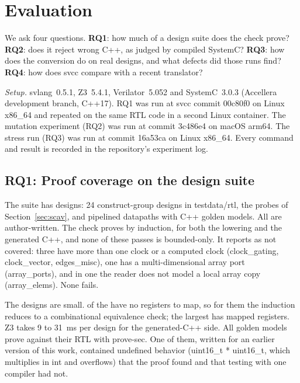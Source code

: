 \documentclass[conference]{IEEEtran}
\newcommand{\code}[1]{{\fontshape{n}\ttfamily #1}}
\begin{document}
\section{Evaluation}
\label{sec:eval}

We ask four questions. \textbf{RQ1}: how much of a design suite does the check prove?
\textbf{RQ2}: does it reject wrong C++, as judged by compiled SystemC? \textbf{RQ3}: how does the
conversion do on real designs, and what defects did those runs find? \textbf{RQ4}: how does
\code{svcc} compare with a recent translator?

\emph{Setup.} \code{svlang}~0.5.1, Z3~5.4.1, Verilator~5.052 and SystemC~3.0.3 (Accellera
\code{development} branch, C++17). RQ1 was run at \code{svcc} commit \code{00c80f0} on Linux x86\_64
and repeated on the same RTL code in a second Linux container. The mutation experiment (RQ2) was
run at commit \code{3c486e4} on macOS arm64. The stress run (RQ3) was run at commit \code{16a53ca} on
Linux x86\_64. Every command and result is recorded in the repository's experiment log.

\subsection{RQ1: Proof coverage on the design suite}

The suite has \nDesigns{} designs: 24 construct-group designs in \code{testdata/rtl}, the
\nProbes{} probes of Section~\ref{sec:scav}, and \nCorpusRtl{} pipelined datapaths with C++ golden
models. All are author-written. The check proves \nProved{} by induction, for both the lowering
and the generated C++, and none of these passes is bounded-only. It reports \nNotCovered{} as not
covered: three have more than one clock or a computed clock (\code{clock\_gating},
\code{clock\_vector}, \code{edges\_misc}), one has a multi-dimensional array port
(\code{array\_ports}), and in one the reader does not model a local array copy
(\code{array\_elems}). None fails.

The designs are small. \nCombinational{} of the \nProved{} have no registers to map, so for them
the induction reduces to a combinational equivalence check; the largest has \nMaxPaired{} mapped
registers. Z3 takes 9 to 31~ms per design for the generated-C++ side. All \nGolden{} golden models
prove against their RTL with \code{prove-sec}. One of them, written for an earlier version of this
work, contained undefined behavior (\code{uint16\_t * uint16\_t}, which multiplies in \code{int} and
overflows) that the proof found and that testing with one compiler had not.
\end{document}
